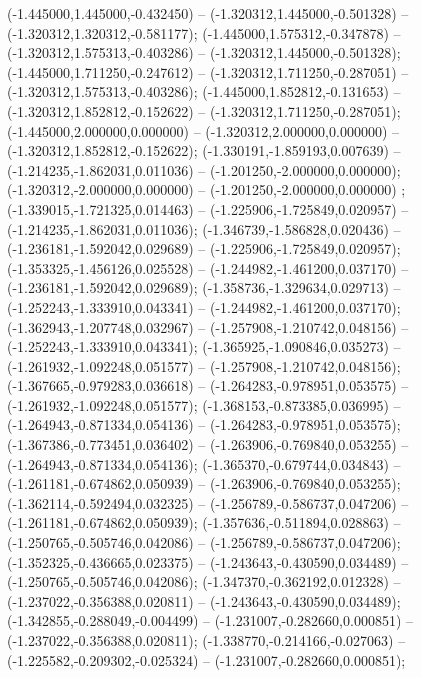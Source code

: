  (-1.445000,1.445000,-0.432450) -- (-1.320312,1.445000,-0.501328) -- (-1.320312,1.320312,-0.581177);
 (-1.445000,1.575312,-0.347878) -- (-1.320312,1.575313,-0.403286) -- (-1.320312,1.445000,-0.501328);
 (-1.445000,1.711250,-0.247612) -- (-1.320312,1.711250,-0.287051) -- (-1.320312,1.575313,-0.403286);
 (-1.445000,1.852812,-0.131653) -- (-1.320312,1.852812,-0.152622) -- (-1.320312,1.711250,-0.287051);
 (-1.445000,2.000000,0.000000) -- (-1.320312,2.000000,0.000000) -- (-1.320312,1.852812,-0.152622);
 (-1.330191,-1.859193,0.007639) -- (-1.214235,-1.862031,0.011036) -- (-1.201250,-2.000000,0.000000);
 (-1.320312,-2.000000,0.000000) -- (-1.201250,-2.000000,0.000000) ;
 (-1.339015,-1.721325,0.014463) -- (-1.225906,-1.725849,0.020957) -- (-1.214235,-1.862031,0.011036);
 (-1.346739,-1.586828,0.020436) -- (-1.236181,-1.592042,0.029689) -- (-1.225906,-1.725849,0.020957);
 (-1.353325,-1.456126,0.025528) -- (-1.244982,-1.461200,0.037170) -- (-1.236181,-1.592042,0.029689);
 (-1.358736,-1.329634,0.029713) -- (-1.252243,-1.333910,0.043341) -- (-1.244982,-1.461200,0.037170);
 (-1.362943,-1.207748,0.032967) -- (-1.257908,-1.210742,0.048156) -- (-1.252243,-1.333910,0.043341);
 (-1.365925,-1.090846,0.035273) -- (-1.261932,-1.092248,0.051577) -- (-1.257908,-1.210742,0.048156);
 (-1.367665,-0.979283,0.036618) -- (-1.264283,-0.978951,0.053575) -- (-1.261932,-1.092248,0.051577);
 (-1.368153,-0.873385,0.036995) -- (-1.264943,-0.871334,0.054136) -- (-1.264283,-0.978951,0.053575);
 (-1.367386,-0.773451,0.036402) -- (-1.263906,-0.769840,0.053255) -- (-1.264943,-0.871334,0.054136);
 (-1.365370,-0.679744,0.034843) -- (-1.261181,-0.674862,0.050939) -- (-1.263906,-0.769840,0.053255);
 (-1.362114,-0.592494,0.032325) -- (-1.256789,-0.586737,0.047206) -- (-1.261181,-0.674862,0.050939);
 (-1.357636,-0.511894,0.028863) -- (-1.250765,-0.505746,0.042086) -- (-1.256789,-0.586737,0.047206);
 (-1.352325,-0.436665,0.023375) -- (-1.243643,-0.430590,0.034489) -- (-1.250765,-0.505746,0.042086);
 (-1.347370,-0.362192,0.012328) -- (-1.237022,-0.356388,0.020811) -- (-1.243643,-0.430590,0.034489);
 (-1.342855,-0.288049,-0.004499) -- (-1.231007,-0.282660,0.000851) -- (-1.237022,-0.356388,0.020811);
 (-1.338770,-0.214166,-0.027063) -- (-1.225582,-0.209302,-0.025324) -- (-1.231007,-0.282660,0.000851);
